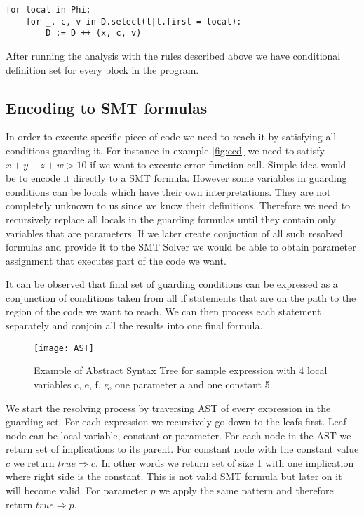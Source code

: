 \documentclass[letterpaper,12pt]{article}
\begin{document}
\begin{enumerate}
\begin{itemize}
\begin{lstlisting}
for local in Phi:
    for _, c, v in D.select(t|t.first = local):
        D := D ++ (x, c, v)
\end{lstlisting}
\end{itemize}
\end{enumerate}

After running the analysis with the rules described above we have conditional definition set for every block in the program. 

\subsection{Encoding to SMT formulas}
In order to execute specific piece of code we need to reach it by satisfying all conditions guarding it. For instance in example \ref{fig:ecd} we need to satisfy $x + y + z + w > 10$ if we want to execute error function call. Simple idea would be to encode it directly to a SMT formula. However some variables in guarding conditions can be locals which have their own interpretations. They are not completely unknown to us since we know their definitions. Therefore we need to recursively replace all locals in the guarding formulas until they contain only variables that are parameters. If we later create conjuction of all such resolved formulas and provide it to the SMT Solver we would be able to obtain parameter assignment that executes part of the code we want.

It can be observed that final set of guarding conditions can be expressed as a conjunction of conditions taken from all if statements that are on the path to the region of the code we want to reach. We can then process each statement separately and conjoin all the results into one final formula.

\begin{figure}[ht] 
    \centering \texttt{[image: AST]}
    \caption{
    \label{fig:ast}
        Example of Abstract Syntax Tree for sample expression with 4 local variables c, e, f, g, one parameter a and one constant 5.
    }
\end{figure}

We start the resolving process by traversing AST of every expression in the guarding set. For each expression we recursively go down to the leafs first. Leaf node can be local variable, constant or parameter. For each node in the AST we return set of implications to its parent. For constant node with the constant value $c$ we return ${true \Rightarrow c}$. In other words we return set of size 1 with one implication where right side is the constant. This is not valid SMT formula but later on it will become valid. For parameter $p$ we apply the same pattern and therefore return ${true \Rightarrow p}$.
\end{document}
